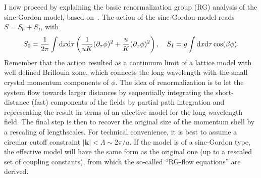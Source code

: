 I now proceed by explaining the basic renormalization group (RG) analysis of the sine-Gordon model, based on~\cite{Gogolin2004}.
The action of the sine-Gordon model reads $S = S_0 + S_I$, with
\begin{align}
    S_0 = \frac1{2\pi}\int\mathrm d x\mathrm d\tau\left( \frac1{uK}(\partial_\tau\phi)^2 + \frac uK (\partial_x\phi)^2 \right)
    ,\quad
    S_I = g\int\mathrm d x\mathrm d\tau\cos(\beta\phi)
    .
\end{align}
Remember that the action resulted as a continuum limit of a lattice model with well defined Brillouin zone, which connects the long wavelength with the small crystal momentum components of $\phi$.
The idea of renormalization is to let the system flow towards larger distances by sequentially integrating the short-distance (fast) components of the fields by partial path integration and representing the result in terms of an effective model for the long-wavelength field.
The final step is then to recover the original size of the momentum shell by a rescaling of lengthscales.
For technical convenience, it is best to assume a circular cutoff constraint $|{\bm k}|<\Lambda\sim2\pi/a$.
If the model is of a sine-Gordon type, the effective model will have the same form as the original one (up to a rescaled set of coupling constants), from which the so-called ``RG-flow equations'' are derived.

